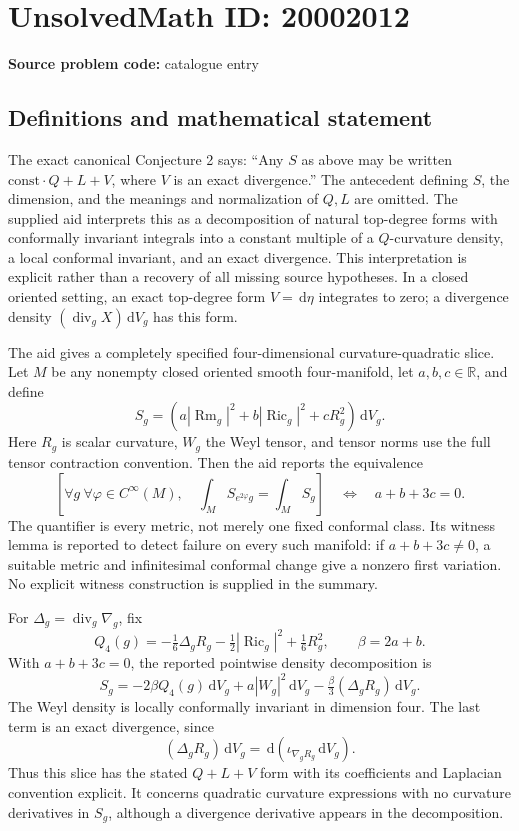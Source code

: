 \documentclass[11pt]{article}
\newcommand{\R}{\mathbb{R}}
\newcommand{\dd}{\,\mathrm{d}}
\begin{document}
\section*{UnsolvedMath ID: 20002012}
\textbf{Source problem code:} catalogue entry
\subsection{Definitions and mathematical statement}
The exact canonical Conjecture 2 says: ``Any \(S\) as above may be written \(\mathrm{const}\cdot Q+L+V\), where \(V\) is an exact divergence.'' The antecedent defining \(S\), the dimension, and the meanings and normalization of \(Q,L\) are omitted. The supplied aid interprets this as a decomposition of natural top-degree forms with conformally invariant integrals into a constant multiple of a \(Q\)-curvature density, a local conformal invariant, and an exact divergence. This interpretation is explicit rather than a recovery of all missing source hypotheses. In a closed oriented setting, an exact top-degree form \(V=\dd\eta\) integrates to zero; a divergence density \((\operatorname{div}_gX)\dd V_g\) has this form.

The aid gives a completely specified four-dimensional curvature-quadratic slice. Let \(M\) be any nonempty closed oriented smooth four-manifold, let \(a,b,c\in\R\), and define
\[
 S_g=(a|\operatorname{Rm}_g|^2+b|\operatorname{Ric}_g|^2+cR_g^2)\dd V_g.
\]
Here \(R_g\) is scalar curvature, \(W_g\) the Weyl tensor, and tensor norms use the full tensor contraction convention. Then the aid reports the equivalence
\[
 \left[\forall g\ \forall\varphi\in C^\infty(M),\quad
 \int_M S_{e^{2\varphi}g}=\int_M S_g\right]
 \quad\Longleftrightarrow\quad a+b+3c=0.
\]
The quantifier is every metric, not merely one fixed conformal class. Its witness lemma is reported to detect failure on every such manifold: if \(a+b+3c\ne0\), a suitable metric and infinitesimal conformal change give a nonzero first variation. No explicit witness construction is supplied in the summary.

For \(\Delta_g=\operatorname{div}_g\nabla_g\), fix
\[
 Q_4(g)=-\tfrac16\Delta_g R_g-\tfrac12|\operatorname{Ric}_g|^2+\tfrac16R_g^2,
 \qquad \beta=2a+b.
\]
With \(a+b+3c=0\), the reported pointwise density decomposition is
\[
 S_g=-2\beta Q_4(g)\dd V_g
       +a|W_g|^2\dd V_g
       -\tfrac\beta3(\Delta_g R_g)\dd V_g.
\]
The Weyl density is locally conformally invariant in dimension four. The last term is an exact divergence, since
\[
 (\Delta_g R_g)\dd V_g=\dd(\iota_{\nabla_gR_g}\dd V_g).
\]
Thus this slice has the stated \(Q+L+V\) form with its coefficients and Laplacian convention explicit. It concerns quadratic curvature expressions with no curvature derivatives in \(S_g\), although a divergence derivative appears in the decomposition.
\end{document}
